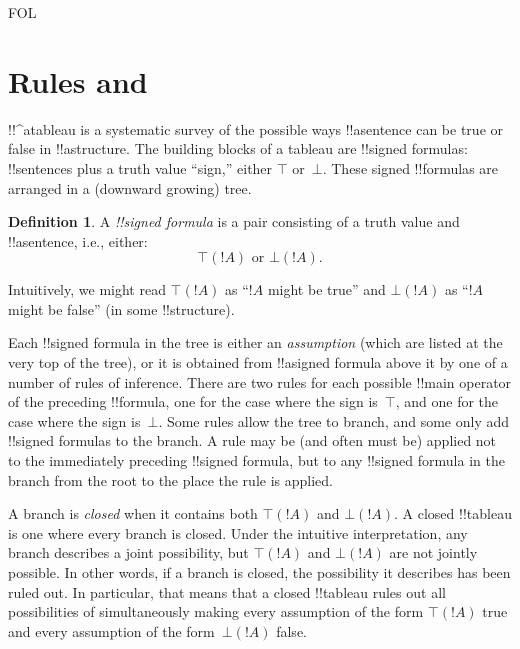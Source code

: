 \documentclass[10pt,a4paper]{article}
\theoremstyle{plain}
\theoremstyle{definition}
\newtheorem{defn}[thm]{Definition}
\theoremstyle{remark}
\newcommand*{\olfileid}[3]{}
\newcommand*{\olsection}[1]{\section*{#1}}
\providecommand{\sFmla}[2]{#1(#2)}
\providecommand{\True}{\top}
\providecommand{\False}{\bot}
\providecommand{\iftag}[1]{#1}
\providecommand{\iftag}{}
\begin{document}



\iftag{FOL}
      {\olfileid{fol}{tab}{rul}}
      {\olfileid{pl}{tab}{rul}}

\olsection{Rules and }

!!^a{tableau} is a systematic survey of the possible ways
!!a{sentence} can be true or false in !!a{structure}. The building
blocks of a tableau are !!{signed formula}s: !!{sentence}s plus a
truth value ``sign,'' either $\True$ or~$\False$. These signed
!!{formula}s are arranged in a (downward growing) tree.

\begin{defn}
  A \emph{!!{signed formula}} is a pair consisting of a truth value
  and !!a{sentence}, i.e., either:
  \[
  \sFmla{\True}{!A} \text{ or } \sFmla{\False}{!A}.
  \]
\end{defn}

Intuitively, we might read $\sFmla{\True}{!A}$ as ``$!A$ might be
true'' and $\sFmla{\False}{!A}$ as ``$!A$ might be false'' (in some
!!{structure}).

Each !!{signed formula} in the tree is either an \emph{assumption}
(which are listed at the very top of the tree), or it is obtained from
!!a{signed formula} above it by one of a number of rules of
inference. There are two rules for each possible !!{main operator} of
the preceding !!{formula}, one for the case where the sign is~$\True$,
and one for the case where the sign is~$\False$. Some rules allow the
tree to branch, and some only add !!{signed formula}s to the branch.
A rule may be (and often must be) applied not to the immediately
preceding !!{signed formula}, but to any !!{signed formula} in the
branch from the root to the place the rule is applied.

A branch is \emph{closed} when it contains both $\sFmla{\True}{!A}$
and $\sFmla{\False}{!A}$. A closed !!{tableau} is one where every branch
is closed.  Under the intuitive interpretation, any branch describes a
joint possibility, but $\sFmla{\True}{!A}$ and $\sFmla{\False}{!A}$
are not jointly possible. In other words, if a branch is closed, the
possibility it describes has been ruled out. In particular, that means
that a closed !!{tableau} rules out all possibilities of simultaneously
making every assumption of the form $\sFmla{\True}{!A}$ true and every
assumption of the form~$\sFmla{\False}{!A}$ false.
\end{document}
